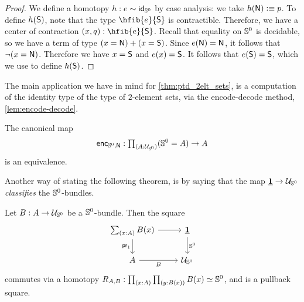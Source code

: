 \begin{proof}
We define a homotopy $h:e\htpy \idfunc[\sphere{0}]$ by case analysis: we take
$h(\north)\defeq p$. To define $h(\south)$, note that the type
$\hfib{e}{\south}$ is contractible. Therefore, we have a center of contraction
$\pairr{x,q}:\hfib{e}{\south}$. Recall that equality on $\sphere{0}$ is decidable,
so we have a term of type $(x=\north)+(x=\south)$. Since $e(\north)=\north$,
it follows that $\neg(x=\north)$. Therefore we have $x=\south$ and $e(x)=\south$.
It follows that $e(\south)=\south$, which we use to define $h(\south)$. 
\end{proof}

The main application we have in mind for \autoref{thm:ptd_2elt_sets}, is
a computation of the identity type of the type of $2$\nobreakdash-element sets, via
the encode-decode method, \autoref{lem:encode-decode}.

\begin{cor}\label{cor:id_U2}
The canonical map
\begin{equation*}
\mathsf{enc}_{{\sphere{0}},\north} : \prd*{A:\UU_{\sphere{0}}} ({\sphere{0}}= A)\to A
\end{equation*}
is an equivalence.
\end{cor}

Another way of stating the following theorem, is by saying that the map
$\unit\to\UU_{\sphere{0}}$ \emph{classifies} the ${\sphere{0}}$\nobreakdash-bundles.

\begin{thm}\label{lem:classifyer_U2}
Let $B:A\to\UU_{\sphere{0}}$ be a ${\sphere{0}}$\nobreakdash-bundle. Then the square
\begin{equation*}
\begin{tikzcd}
\sm{x:A}B(x) \arrow[r] \arrow[d,swap,"\proj 1"] & \unit \arrow[d,"{\sphere{0}}"] \\
A \arrow[r,swap,"B"] & \UU_{\sphere{0}}
\end{tikzcd}
\end{equation*}
commutes via a homotopy $R_{A,B}:\prd{x:A}{y:B(x)} \eqv{B(x)}{\sphere{0}}$, and is a pullback square. 
\end{thm}

